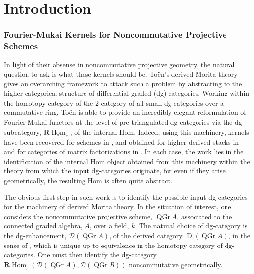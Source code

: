 \chapter*{Introduction}
\subsection*{Fourier-Mukai Kernels for Noncommutative Projective Schemes}

In light of their absense in noncommutative projective geometry, the natural question to ask is what these kernels should be.
To\"en's derived Morita theory \parencite{Toen07} gives an overarching framework to attack such a problem by abstracting to the higher categorical structure of differential graded (dg) categories.
Working within the homotopy category of the 2-category of all small dg-categories over a commutative ring, To\"en is able to provide an incredibly elegant reformulation of Fourier-Mukai functors at the level of pre-triangulated dg-categories via the dg-subcategory, \(\mathbf{R}\underline{\operatorname{Hom}}_c\), of the internal Hom.
Indeed, using this machinery, kernels have been recovered for schemes in \textcite{Toen07}, and obtained for higher derived stacks in \textcite{BFN10} and for categories of matrix factorizations in \textcite{Dyckerhoff11,PV12,BFK14}.
In each case, the work lies in the identification of the internal Hom object obtained from this machinery within the theory from which the input dg-categories originate, for even if they arise geometrically, the resulting Hom is often quite abstract.

The obvious first step in such work is to identify the possible input dg-categories for the machinery of derived Morita theory.
In the situation of interest, one considers the noncommutative projective scheme, \(\operatorname{QGr} A\), associated to the connected graded algebra, \(A\), over a field, \(k\). 
The natural choice of dg-category is the dg-enhancement, \(\mathcal{D}(\operatorname{QGr} A)\), of the derived category \(\operatorname{D}(\operatorname{QGr} A)\), in the sense of \textcite{Lunts-Orlov}, which is unique up to equivalence in the homotopy category of dg-categories.
One must then identify the dg-category \(\mathbf{R}\underline{\operatorname{Hom}}_c(\mathcal{D}(\operatorname{QGr} A), \mathcal{D}(\operatorname{QGr} B))\) noncommutative geometrically.

